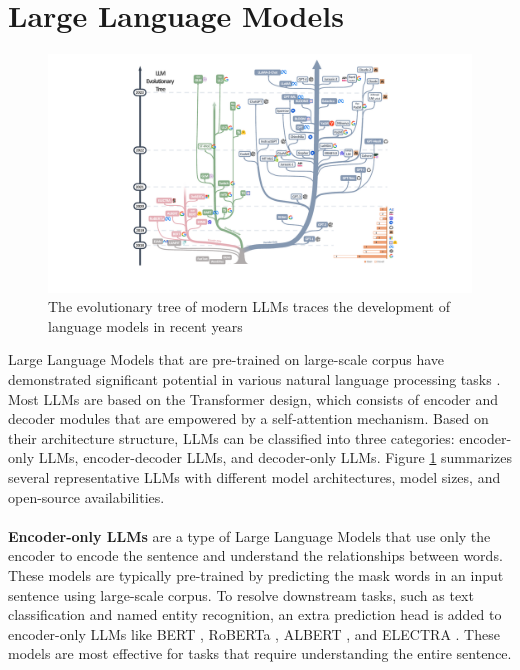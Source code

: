 \section{Large Language Models}
\begin{figure}[hbt]
    \centering
    \includegraphics[width=0.95\linewidth]{theoretical-background/image/evo_tree.pdf}
    \caption{The evolutionary tree of modern LLMs traces the development of language models in recent years \cite{yang2023harnessing}}
    \label{fig:evo_tree}
\end{figure}
Large Language Models that are pre-trained on large-scale corpus have demonstrated significant potential in various natural language processing  tasks . Most LLMs are based on the Transformer design, which consists of encoder and decoder modules that are empowered by a self-attention mechanism. Based on their architecture structure, LLMs can be classified into three categories: encoder-only LLMs, encoder-decoder LLMs, and decoder-only LLMs. Figure \ref{fig:evo_tree} summarizes several representative LLMs with different model architectures, model sizes, and open-source availabilities. \\\\
\textbf{Encoder-only LLMs} are a type of Large Language Models that use only the encoder to encode the sentence and understand the relationships between words. These models are typically pre-trained by predicting the mask words in an input sentence using large-scale corpus. To resolve downstream tasks, such as text classification and named entity recognition, an extra prediction head is added to encoder-only LLMs like BERT \cite{devlin-etal-2019-bert}, RoBERTa \cite{liu2019roberta}, ALBERT \cite{lan2019albert}, and ELECTRA \cite{clark2020electra}. These models are most effective for tasks that require understanding the entire sentence.\\\\
